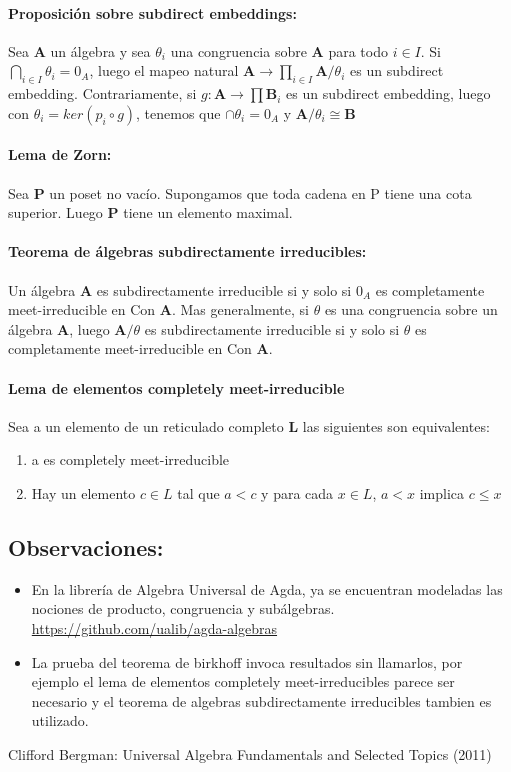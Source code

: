 \documentclass{article}
\begin{document}
\paragraph{Proposición sobre subdirect embeddings:}
Sea \textbf{A} un álgebra y sea $\theta_i$ una congruencia sobre \textbf{A} para todo $i \in I$. Si $\bigcap_{i \in I} \theta_i = 0_A$, luego el mapeo natural $\textbf{A} \to \prod_{i \in I} \textbf{A}/ \theta_i$ es un subdirect embedding. Contrariamente, si $g \colon \textbf{A} \to \prod \textbf{B}_i$ es un subdirect embedding, luego con $\theta_i = ker(p_i \circ g)$, tenemos que $\cap \theta_i = 0_A$ y $\textbf{A}/\theta_i \cong \textbf{B}$

\paragraph{Lema de Zorn:}
Sea \textbf{P} un poset no vacío. Supongamos que toda cadena en P tiene una cota superior. Luego \textbf{P} tiene un elemento maximal.

\paragraph{Teorema de álgebras subdirectamente irreducibles:}
Un álgebra \textbf{A} es subdirectamente irreducible si y solo si $0_A$ es completamente meet-irreducible en Con \textbf{A}. Mas generalmente, si $\theta$ es una congruencia sobre un álgebra \textbf{A}, luego $\textbf{A}/\theta$ es subdirectamente irreducible si y solo si $\theta$ es completamente meet-irreducible en Con \textbf{A}.

\paragraph{Lema de elementos completely meet-irreducible}
Sea a un elemento de un reticulado completo \textbf{L} las siguientes son equivalentes:
\begin{enumerate}
    \item a es completely meet-irreducible
    \item Hay un elemento $c \in L$ tal que $a < c$ y para cada $x \in L$, $a < x$ implica $ c \leq x$
\end{enumerate}

\subsection{Observaciones:}
\begin{itemize}
    \item En la librería de Algebra Universal de Agda, ya se encuentran modeladas las nociones de producto, congruencia y subálgebras. \url{https://github.com/ualib/agda-algebras} 
    \item La prueba del teorema de birkhoff invoca resultados sin llamarlos, por ejemplo el lema de elementos completely meet-irreducibles parece ser necesario y el teorema de algebras subdirectamente irreducibles tambien es utilizado. 
\end{itemize}

\begin{thebibliography}{1}

 Clifford Bergman: Universal Algebra Fundamentals and Selected Topics (2011)

\end{thebibliography}
\end{document}
